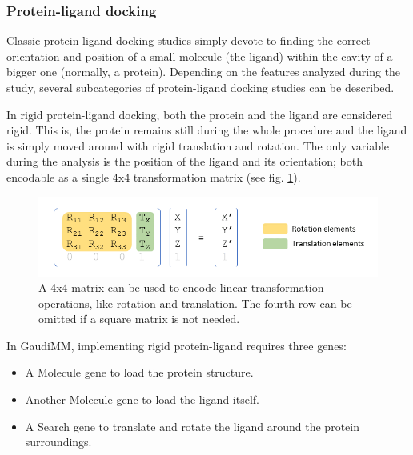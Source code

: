 \subsubsection{Protein-ligand docking}
Classic protein-ligand docking studies simply devote to finding the correct orientation and position of a small molecule (the ligand) within the cavity of a bigger one (normally, a protein). Depending on the features analyzed during the study, several subcategories of protein-ligand docking studies can be described.

In rigid protein-ligand docking, both the protein and the ligand are considered rigid. This is, the protein remains still during the whole procedure and the ligand is simply moved around with rigid translation and rotation. The only variable during the analysis is the position of the ligand and its orientation; both encodable as a single 4x4 transformation matrix (see fig. \ref{fig:xform-matrices}).


\begin{figure} %
	\begin{Center}
		\includegraphics[width=\textwidth]{./figures/06/xform-matrices.png}
	\end{Center}
	\caption[Transformation matrices]{A 4x4 matrix can be used to encode linear transformation operations, like rotation and translation. The fourth row can be omitted if a square matrix is not needed.}
	\label{fig:xform-matrices}
\end{figure}


In GaudiMM, implementing rigid protein-ligand requires three genes:

\begin{itemize}
	\item A Molecule gene to load the protein structure.

	\item Another Molecule gene to load the ligand itself.

	\item A Search gene to translate and rotate the ligand around the protein surroundings.
\end{itemize}

